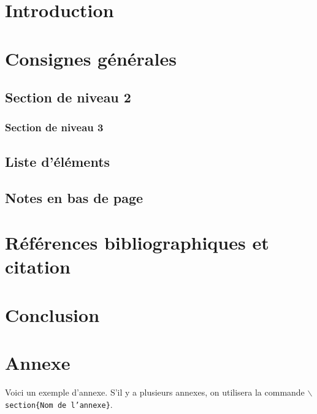 \documentclass[soumission]{ir}
\affiliation{
    \affil{1}Université de Lorraine\\
    UFR MIM -- LORIA\\
    3 Rue Augustin Fresnel, 57070 Metz\\
    alexandre.blansche@univ-lorraine.fr\\
    \affil{2}Université de Lorraine\\
    UFR MIM -- LGIPM\\
    3 Rue Augustin Fresnel, 57070 Metz\\
    dominique.michel@univ-lorraine.fr
}
\begin{document}
\section{Introduction}

\section{Consignes générales}\label{sec:consignes}

\subsection{Section de niveau 2}

\subsubsection{Section de niveau 3}

\subsection{Liste d'éléments}

\cite{goldberg89genetic}


\subsection{Notes en bas de page}

\section{Références bibliographiques et citation}\label{sec:biblio}

\section{Conclusion}





\appendix

\section*{Annexe}

Voici un exemple d'annexe. S'il y a plusieurs annexes, on utilisera la commande \texttt{$\backslash$section\{Nom de l'annexe\}}.
\end{document}

